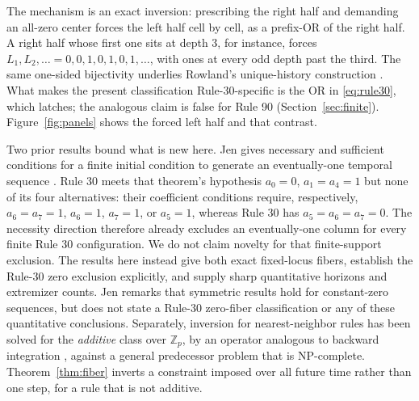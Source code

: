 \documentclass[11pt]{article}
\begin{document}
The mechanism is an exact inversion: prescribing the right half and demanding
an all-zero center forces the left half cell by cell, as a prefix-OR of the
right half.  A right half whose first one sits at depth $3$, for instance,
forces $L_1,L_2,\ldots=0,0,1,0,1,0,1,\ldots$, with ones at every odd depth past
the third.  The same one-sided bijectivity underlies Rowland's unique-history
construction \cite[Prop.~1]{rowland}.  What makes the present classification
Rule-30-specific is the OR in \eqref{eq:rule30}, which latches; the analogous
claim is false for Rule 90 (Section~\ref{sec:finite}).  Figure~\ref{fig:panels}
shows the forced left half and that contrast.

Two prior results bound what is new here.  Jen gives necessary and sufficient
conditions for a finite initial condition to generate an eventually-one
temporal sequence \cite[Thm.~7a]{jen1986}.  Rule 30 meets that theorem's
hypothesis $a_0=0$, $a_1=a_4=1$ but none of its four alternatives: their
coefficient conditions require, respectively, $a_6=a_7=1$, $a_6=1$,
$a_7=1$, or $a_5=1$, whereas Rule 30 has $a_5=a_6=a_7=0$.  The necessity
direction therefore already excludes an eventually-one column for every
finite Rule 30 configuration.  We do not claim novelty for that finite-support
exclusion.  The results here instead give both exact fixed-locus fibers,
establish the Rule-30 zero exclusion explicitly, and supply sharp quantitative
horizons and extremizer counts.  Jen remarks that symmetric results hold for
constant-zero sequences, but does not state a Rule-30 zero-fiber classification
or any of these quantitative conclusions.  Separately, inversion for
nearest-neighbor rules has been solved for the \emph{additive} class over
$\mathbb Z_p$, by an operator
analogous to backward integration \cite{voorhees}, against a general predecessor
problem that is NP-complete.  Theorem~\ref{thm:fiber} inverts a constraint
imposed over all future time rather than one step, for a rule that is not
additive.
\end{document}
